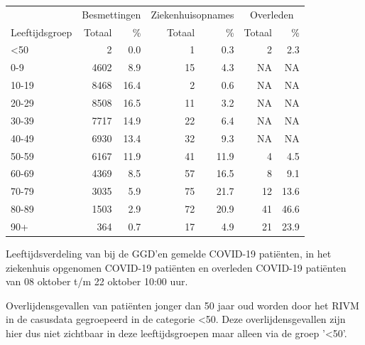 \documentclass[
  english,
  man,floatsintext]{apa6}
\begin{document}
\begin{table}
\centering\begingroup\fontsize{11}{13}\selectfont

\begin{threeparttable}
\begin{tabular}{lrrrrrr}
\toprule
\multicolumn{1}{c}{ } & \multicolumn{2}{c}{Besmettingen} & \multicolumn{2}{c}{Ziekenhuisopnames} & \multicolumn{2}{c}{Overleden} \\
\cmidrule(l{3pt}r{3pt}){2-3} \cmidrule(l{3pt}r{3pt}){4-5} \cmidrule(l{3pt}r{3pt}){6-7}
Leeftijdsgroep & Totaal & \% & Totaal & \% & Totaal & \%\\
\midrule
<50 & 2 & 0.0 & 1 & 0.3 & 2 & 2.3\\
0-9 & 4602 & 8.9 & 15 & 4.3 & NA & NA\\
10-19 & 8468 & 16.4 & 2 & 0.6 & NA & NA\\
20-29 & 8508 & 16.5 & 11 & 3.2 & NA & NA\\
30-39 & 7717 & 14.9 & 22 & 6.4 & NA & NA\\
40-49 & 6930 & 13.4 & 32 & 9.3 & NA & NA\\
50-59 & 6167 & 11.9 & 41 & 11.9 & 4 & 4.5\\
60-69 & 4369 & 8.5 & 57 & 16.5 & 8 & 9.1\\
70-79 & 3035 & 5.9 & 75 & 21.7 & 12 & 13.6\\
80-89 & 1503 & 2.9 & 72 & 20.9 & 41 & 46.6\\
90+ & 364 & 0.7 & 17 & 4.9 & 21 & 23.9\\
\bottomrule
\end{tabular}
\begin{tablenotes}
\item[1] Leeftijdsverdeling van bij de GGD’en gemelde COVID-19 patiënten, in het ziekenhuis opgenomen COVID-19 patiënten en overleden COVID-19 patiënten van 08 oktober t/m 22 oktober 10:00 uur.
\item[2] Overlijdensgevallen van patiënten jonger dan 50 jaar oud worden door het RIVM in de casusdata gegroepeerd in de categorie <50. Deze overlijdensgevallen zijn hier dus niet zichtbaar in deze leeftijdsgroepen maar alleen via de groep '<50'.
\end{tablenotes}
\end{threeparttable}
\endgroup{}
\end{table}

\newpage
\end{document}
